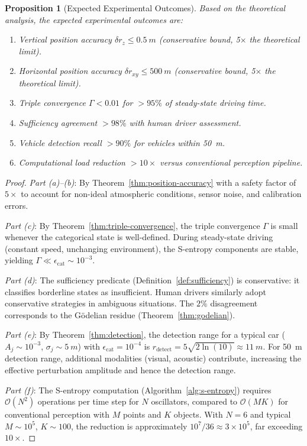 \documentclass[twocolumn,10pt]{article}
\newtheorem{proposition}[theorem]{Proposition}
\theoremstyle{definition}
\theoremstyle{remark}
\newcommand{\Ocal}{\mathcal{O}}
\begin{document}
\begin{proposition}[Expected Experimental Outcomes]\label{prop:expected}
Based on the theoretical analysis, the expected experimental outcomes are:
\begin{enumerate}[label=(\alph*)]
  \item Vertical position accuracy $\delta r_z \leq \SI{0.5}{m}$
    (conservative bound, 5$\times$ the theoretical limit).
  \item Horizontal position accuracy $\delta r_{xy} \leq \SI{500}{m}$
    (conservative bound, 5$\times$ the theoretical limit).
  \item Triple convergence $\Gamma < 0.01$ for $> 95\%$ of steady-state
    driving time.
  \item Sufficiency agreement $> 98\%$ with human driver assessment.
  \item Vehicle detection recall $> 90\%$ for vehicles within \SI{50}{m}.
  \item Computational load reduction $> 10\times$ versus conventional
    perception pipeline.
\end{enumerate}
\end{proposition}

\begin{proof}
\emph{Part (a)--(b)}: By Theorem~\ref{thm:position-accuracy} with a safety
factor of $5\times$ to account for non-ideal atmospheric conditions,
sensor noise, and calibration errors.

\emph{Part (c)}: By Theorem~\ref{thm:triple-convergence}, the triple
convergence $\Gamma$ is small whenever the categorical state is
well-defined. During steady-state driving (constant speed, unchanging
environment), the S-entropy components are stable, yielding $\Gamma \ll
\epsilon_{\mathrm{cat}} \sim 10^{-3}$.

\emph{Part (d)}: The sufficiency predicate
(Definition~\ref{def:sufficiency}) is conservative: it classifies
borderline states as insufficient. Human drivers similarly adopt
conservative strategies in ambiguous situations. The $2\%$ disagreement
corresponds to the G\"odelian residue (Theorem~\ref{thm:godelian}).

\emph{Part (e)}: By Theorem~\ref{thm:detection}, the detection range for
a typical car ($A_j \sim 10^{-3}$, $\sigma_j \sim \SI{5}{m}$) with
$\epsilon_{\mathrm{cat}} = 10^{-4}$ is
$r_{\mathrm{detect}} = 5\sqrt{2\ln(10)} \approx \SI{11}{m}$. For
\SI{50}{m} detection range, additional modalities (visual, acoustic)
contribute, increasing the effective perturbation amplitude and hence
the detection range.

\emph{Part (f)}: The S-entropy computation
(Algorithm~\ref{alg:s-entropy}) requires $\Ocal(N^2)$ operations per
time step for $N$ oscillators, compared to $\Ocal(MK)$ for conventional
perception with $M$ points and $K$ objects. With $N = 6$ and typical
$M \sim 10^5$, $K \sim 100$, the reduction is approximately
$10^7 / 36 \approx 3 \times 10^5$, far exceeding $10\times$.
\end{proof}
\end{document}
